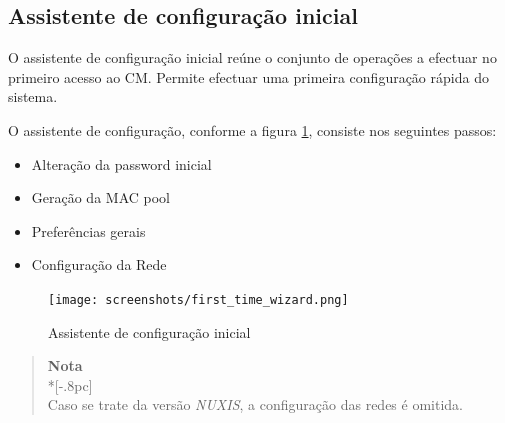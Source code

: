 \subsection{Assistente de configuração inicial}
O assistente de configuração inicial reúne o conjunto de operações a efectuar no primeiro acesso ao CM. Permite efectuar uma primeira configuração rápida do sistema.

O assistente de configuração, conforme a figura \ref{fig:first_time_wizard}, consiste nos seguintes passos:
\begin{itemize}
	\item Alteração da password inicial
	\item Geração da MAC pool
    \item Preferências gerais
	\item Configuração da Rede
\end{itemize}

\begin{figure}[H]
        \begin{center}
        \texttt{[image: screenshots/first\_time\_wizard.png]}
        \caption{Assistente de configuração inicial}
        \label{fig:first_time_wizard}
        \end{center}
\end{figure}

\begin{quote}
	{\large \bf Nota} \\*[-.8pc]
	\underline{\hspace{6in}} \\
	Caso se trate da versão \emph{NUXIS}, a configuração das redes é omitida.
\end{quote}

